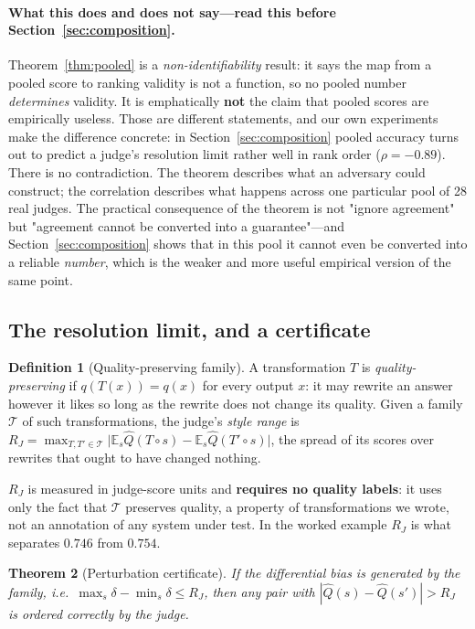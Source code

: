 \documentclass{article}
\theoremstyle{plain}
\newtheorem{theorem}{Theorem}
\theoremstyle{definition}
\newtheorem{definition}[theorem]{Definition}
\newcommand{\Qhat}{\hat{Q}}
\begin{document}
\paragraph{What this does and does not say---read this before Section~\ref{sec:composition}.}
Theorem~\ref{thm:pooled} is a \emph{non-identifiability} result: it says the map from a pooled
score to ranking validity is not a function, so no pooled number \emph{determines} validity. It
is emphatically \textbf{not} the claim that pooled scores are empirically useless. Those are
different statements, and our own experiments make the difference concrete: in
Section~\ref{sec:composition} pooled accuracy turns out to predict a judge's resolution limit
rather well in rank order ($\rho=-0.89$). There is no contradiction. The theorem describes what
an adversary could construct; the correlation describes what happens across one particular pool
of 28 real judges. The practical consequence of the theorem is not "ignore agreement" but
"agreement cannot be converted into a guarantee"---and Section~\ref{sec:composition} shows that
in this pool it cannot even be converted into a reliable \emph{number}, which is the weaker and
more useful empirical version of the same point.

\subsection{The resolution limit, and a certificate}

\begin{definition}[Quality-preserving family]
A transformation $T$ is \emph{quality-preserving} if $q(T(x))=q(x)$ for every output $x$: it
may rewrite an answer however it likes so long as the rewrite does not change its quality.
Given a family $\mathcal{T}$ of such transformations, the judge's \emph{style range} is
$R_J=\max_{T,T'\in\mathcal{T}}\bigl|\mathbb{E}_s\Qhat(T\!\circ\! s)-\mathbb{E}_s\Qhat(T'\!\circ\! s)\bigr|$,
the spread of its scores over rewrites that ought to have changed nothing.
\end{definition}

$R_J$ is measured in judge-score units and \textbf{requires no quality labels}: it uses only
the fact that $\mathcal{T}$ preserves quality, a property of transformations we wrote, not an
annotation of any system under test. In the worked example $R_J$ is what separates
$0.746$ from $0.754$.

\begin{theorem}[Perturbation certificate]
\label{thm:cert}
If the differential bias is generated by the family, i.e.\ $\max_s\delta-\min_s\delta\le R_J$,
then any pair with $|\Qhat(s)-\Qhat(s')|>R_J$ is ordered correctly by the judge.
\end{theorem}
\end{document}
